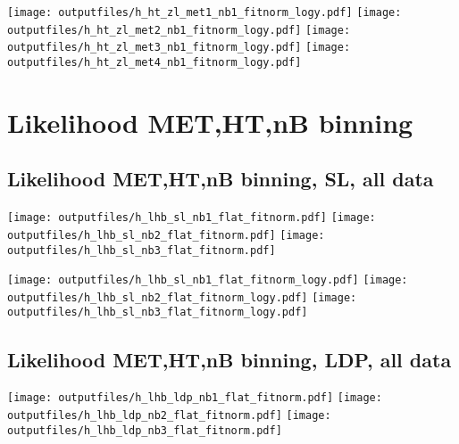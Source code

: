 \documentclass[11pt]{article}
\begin{document}
    \noindent
     \texttt{[image: outputfiles/h\_ht\_zl\_met1\_nb1\_fitnorm\_logy.pdf]}
     \texttt{[image: outputfiles/h\_ht\_zl\_met2\_nb1\_fitnorm\_logy.pdf]}
     \texttt{[image: outputfiles/h\_ht\_zl\_met3\_nb1\_fitnorm\_logy.pdf]}
     \texttt{[image: outputfiles/h\_ht\_zl\_met4\_nb1\_fitnorm\_logy.pdf]}

   \clearpage







   \section{Likelihood MET,HT,nB binning}
    \subsection{ Likelihood MET,HT,nB binning, SL, all data}

    \noindent
     \texttt{[image: outputfiles/h\_lhb\_sl\_nb1\_flat\_fitnorm.pdf]}
     \texttt{[image: outputfiles/h\_lhb\_sl\_nb2\_flat\_fitnorm.pdf]}
     \texttt{[image: outputfiles/h\_lhb\_sl\_nb3\_flat\_fitnorm.pdf]}

    \noindent
     \texttt{[image: outputfiles/h\_lhb\_sl\_nb1\_flat\_fitnorm\_logy.pdf]}
     \texttt{[image: outputfiles/h\_lhb\_sl\_nb2\_flat\_fitnorm\_logy.pdf]}
     \texttt{[image: outputfiles/h\_lhb\_sl\_nb3\_flat\_fitnorm\_logy.pdf]}

    \clearpage






    \subsection{ Likelihood MET,HT,nB binning, LDP, all data}

    \noindent
     \texttt{[image: outputfiles/h\_lhb\_ldp\_nb1\_flat\_fitnorm.pdf]}
     \texttt{[image: outputfiles/h\_lhb\_ldp\_nb2\_flat\_fitnorm.pdf]}
     \texttt{[image: outputfiles/h\_lhb\_ldp\_nb3\_flat\_fitnorm.pdf]}
\end{document}
